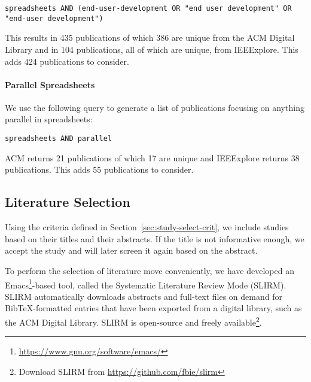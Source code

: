 \documentclass[a4paper]{article}
\begin{document}
\begin{lstlisting}
spreadsheets AND (end-user-development OR "end user development" OR "end-user development")
\end{lstlisting}

\noindent This results in 435 publications of which 386 are unique from the ACM
Digital Library and in 104 publications, all of which are unique, from
IEEExplore. This adds 424 publications to consider.

\paragraph{Parallel Spreadsheets}

We use the following query to generate a list of publications focusing
on anything parallel in spreadsheets:

\begin{lstlisting}
spreadsheets AND parallel
\end{lstlisting}

\noindent ACM returns 21 publications of which 17 are unique and
IEEExplore returns 38 publications. This adds 55 publications to
consider.

\subsection{Literature Selection}
\label{sec:literature-selection}

Using the criteria defined in Section~\ref{sec:study-select-crit}, we
include studies based on their titles and their abstracts. If the
title is not informative enough, we accept the study and will later
screen it again based on the abstract.

To perform the selection of literature move conveniently, we have
developed an
Emacs\footnote{\url{https://www.gnu.org/software/emacs/}}-based tool,
called the Systematic Literature Review Mode (SLIRM). SLIRM
automatically downloads abstracts and full-text files on demand for
BibTeX-formatted entries that have been exported from a digital
library, such as the ACM Digital Library. SLIRM is open-source and
freely available\footnote{Download SLIRM from
  \url{https://github.com/fbie/slirm}}.
\end{document}
